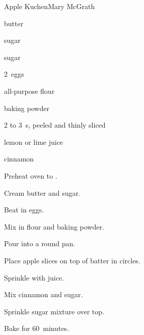 \begin{recipe}{Apple Kuchen\UNTESTED}{Mary McGrath}{}

\begin{ingredients}
\item \C{\half} butter
\item {} sugar
\item {} sugar
\item 2~eggs
\item {} all-purpose flour
\item {} baking powder
\item 2 to 3~s, peeled and thinly sliced
\item {} lemon or lime juice
\item \tp{\half} cinnamon
\end{ingredients}

\begin{directions}
\item Preheat oven to .
\item Cream butter and  sugar.
\item Beat in eggs.
\item Mix in flour and baking powder.
\item Pour into a  round pan.
\item Place apple slices on top of batter in circles.
\item Sprinkle with juice.
\item Mix cinnamon and  sugar.
\item Sprinkle sugar mixture over top.
\item Bake for 60~minutes.
\end{directions}

\end{recipe}
